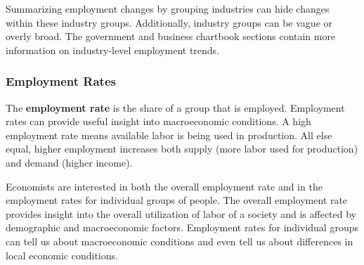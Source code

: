 \begin{minipage}{0.76\textwidth}
\small Summarizing employment changes by grouping industries can hide changes within these industry groups. Additionally, industry groups can be vague or overly broad. The government and business chartbook sections contain more information on industry-level employment trends. 
\end{minipage}
\newpage
\hypertarget{epoplt}{}

\subsubsection*{Employment Rates} 
\begin{minipage}{0.76\textwidth} 
\vspace{-0.5mm}
\small The \textbf{employment rate} is the share of a group that is employed. Employment rates can provide useful insight into macroeconomic conditions. A high employment rate means available labor is being used in production. All else equal, higher employment increases both supply (more labor used for production) and demand (higher income).

Economists are interested in both the overall employment rate and in the employment rates for individual groups of people. The overall employment rate provides insight into the overall utilization of labor of a society and is affected by demographic and macroeconomic factors. Employment rates for individual groups can tell us about macroeconomic conditions and even tell us about differences in local economic conditions. 

 
\vspace{1mm}

\\
\vspace{3mm} 


\end{minipage}
